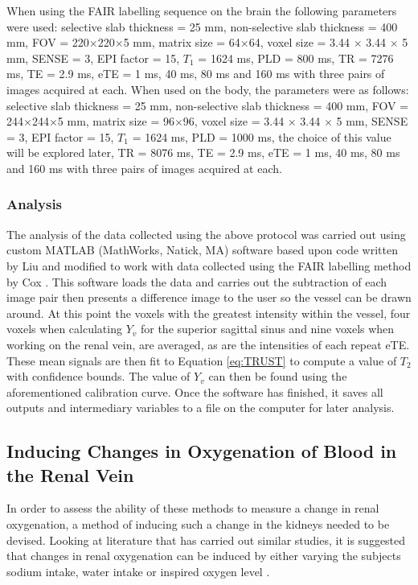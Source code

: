 When using the \ac{FAIR} labelling sequence on the brain the following parameters were used: selective slab thickness = 25 mm, non-selective slab thickness = 400 mm, \ac{FOV} = 220$\times$220$\times$5 mm, matrix size = 64$\times$64, voxel size = 3.44 $\times$ 3.44 $\times$ 5 mm, \ac{SENSE} = 3, \ac{EPI} factor = 15, $T_1$ = 1624 ms, \ac{PLD} = 800 ms, \ac{TR} = 7276 ms, \ac{TE} = 2.9 ms, \ac{eTE} = 1 ms, 40 ms, 80 ms and 160 ms with three pairs of images acquired at each. When used on the body, the parameters were as follows: selective slab thickness = 25 mm, non-selective slab thickness = 400 mm, \ac{FOV} = 244$\times$244$\times$5 mm, matrix size = 96$\times$96, voxel size = 3.44 $\times$ 3.44 $\times$ 5 mm, \ac{SENSE} = 3, \ac{EPI} factor = 15, $T_1$ = 1624 ms, \ac{PLD} = 1000 ms, the choice of this value will be explored later, \ac{TR} = 8076 ms, \ac{TE} = 2.9 ms, \ac{eTE} = 1 ms, 40 ms, 80 ms and 160 ms with three pairs of images acquired at each.\\

\subsubsection{Analysis}
\label{sec:trust_analysis}
The analysis of the data collected using the above protocol was carried out using custom \textsc{MATLAB} (MathWorks, Natick, MA) software based upon code written by Liu and modified to work with data collected using the \ac{FAIR} labelling method by Cox \cite{liu_pro_2011}. This software loads the data and carries out the subtraction of each image pair then presents a difference image to the user so the vessel can be drawn around. At this point the voxels with the greatest intensity within the vessel, four voxels when calculating $Y_v$ for the superior sagittal sinus and nine voxels when working on the renal vein, are averaged, as are the intensities of each repeat \ac{eTE}. These mean signals are then fit to Equation \eqref{eq:TRUST} to compute a value of $T_2$ with confidence bounds. The value of $Y_v$ can then be found using the aforementioned calibration curve. Once the software has finished, it saves all outputs and intermediary variables to a file on the computer for later analysis.

\subsection{Inducing Changes in Oxygenation of Blood in the Renal Vein}

In order to assess the ability of these methods to measure a change in renal oxygenation, a method of inducing such a change in the kidneys needed to be devised. Looking at literature that has carried out similar studies, it is suggested that changes in renal oxygenation can be induced by either varying the subjects sodium intake, water intake or inspired oxygen level \cite{oconnor_comparison_2009, donati_quantitative_2012}.\\

